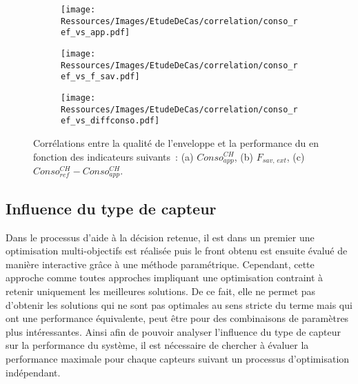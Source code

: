 \begin{figure}
    \centering
    \begin{subfigure}[b]{0.31\textwidth}
        \centering
        \texttt{[image: Ressources/Images/EtudeDeCas/correlation/conso\_ref\_vs\_app.pdf]}
        \caption{}
        \label{fig:conso_ref_vs_app}
    \end{subfigure}
    \quad
    \begin{subfigure}[b]{0.31\textwidth}
        \centering
        \texttt{[image: Ressources/Images/EtudeDeCas/correlation/conso\_ref\_vs\_f\_sav.pdf]}
        \caption{}
        \label{fig:conso_ref_vs_f_sav}
    \end{subfigure}
    \quad
    \begin{subfigure}[b]{0.31\textwidth}
        \centering
        \texttt{[image: Ressources/Images/EtudeDeCas/correlation/conso\_ref\_vs\_diffconso.pdf]}
        \caption{}
        \label{fig:conso_ref_vs_diffconso}
    \end{subfigure}
    \caption[Corrélation entre la qualité de l’enveloppe et la performance du ]
             {Corrélations entre la qualité de l’enveloppe et la performance du 
              en fonction des indicateurs suivants~: (a) $Conso_{app}^{CH}$, (b) $F_{sav,\, ext}$,
              (c) $Conso_{ref}^{CH} - Conso_{app}^{CH}$.}
    \label{fig:conso_ref_vs_app_f_sav}
\end{figure}



\subsection{Influence du type de capteur} %
\label{sub:influence_du_type_de_capteur}
Dans le processus d’aide à la décision retenue, il est dans un premier
une optimisation multi-objectifs est réalisée puis le front obtenu est ensuite
évalué de manière interactive grâce à une méthode paramétrique. Cependant,
cette approche comme toutes approches impliquant une optimisation contraint à retenir
uniquement les meilleures solutions. De ce fait, elle ne permet pas d’obtenir les
solutions qui ne sont pas optimales au sens stricte du terme mais qui ont une
performance équivalente, peut être pour des combinaisons de paramètres plus intéressantes.
Ainsi afin de pouvoir analyser l’influence du type de capteur sur la performance du système,
il est nécessaire de chercher à évaluer la performance maximale pour chaque
capteurs suivant un processus d’optimisation indépendant.

